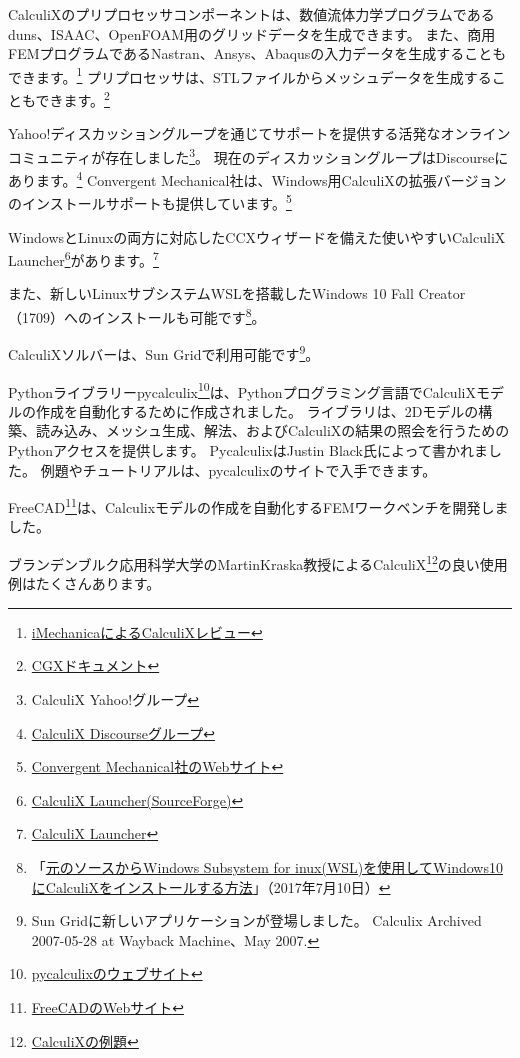 \documentclass[a4j,12pt,twoside,openany]{ltjsarticle}
\begin{document}
CalculiXのプリプロセッサコンポーネントは、数値流体力学プログラムであるduns、ISAAC、OpenFOAM用のグリッドデータを生成できます。
また、商用FEMプログラムであるNastran、Ansys、Abaqusの入力データを生成することもできます。\footnote{\href{http://imechanica.org/node/1628}{iMechanicaによるCalculiXレビュー}}
プリプロセッサは、STLファイルからメッシュデータを生成することもできます。\footnote{\href{http://bconverged.com/calculix/doc/cgx/html/cgx.html}{CGXドキュメント}}

Yahoo!ディスカッショングループを通じてサポートを提供する活発なオンラインコミュニティが存在しました\footnote{CalculiX Yahoo!グループ}。
現在のディスカッショングループはDiscourseにあります。\footnote{\href{https://calculix.discourse.group/}{CalculiX Discourseグループ}}
Convergent Mechanical社は、Windows用CalculiXの拡張バージョンのインストールサポートも提供しています。\footnote{\href{http://www.bconverged.com/}{Convergent Mechanical社のWebサイト}}

WindowsとLinuxの両方に対応したCCXウィザードを備えた使いやすいCalculiX Launcher\footnote{\href{https://sourceforge.net/projects/calculixforwin/}{CalculiX Launcher(SourceForge)}}があります。\footnote{\href{http://calculixforwin.blogspot.mx/2015/05/calculix-launcher.html}{CalculiX Launcher}}

また、新しいLinuxサブシステムWSLを搭載したWindows 10 Fall Creator（1709）へのインストールも可能です\footnote{「\href{https://carlomonjaraztec.wordpress.com/2017/07/10/ccx_in_win10/}{元のソースからWindows Subsystem for inux(WSL)を使用してWindows10にCalculiXをインストールする方法}」（2017年7月10日）}。

CalculiXソルバーは、Sun Gridで利用可能です\footnote{Sun Gridに新しいアプリケーションが登場しました。
Calculix Archived 2007-05-28 at Wayback Machine、May 2007.}。

Pythonライブラリーpycalculix\footnote{\href{http://justinablack.com/pycalculix/}{pycalculixのウェブサイト}}は、Pythonプログラミング言語でCalculiXモデルの作成を自動化するために作成されました。
ライブラリは、2Dモデルの構築、読み込み、メッシュ生成、解法、およびCalculiXの結果の照会を行うためのPythonアクセスを提供します。
PycalculixはJustin Black氏によって書かれました。
例題やチュートリアルは、pycalculixのサイトで入手できます。

FreeCAD\footnote{\href{https://freecadweb.org/}{FreeCADのWebサイト}}は、Calculixモデルの作成を自動化するFEMワークベンチを開発しました。

ブランデンブルク応用科学大学のMartinKraska教授によるCalculiX\footnote{\href{https://github.com/mkraska/CalculiX-Examples/}{CalculiXの例題}}の良い使用例はたくさんあります。
\end{document}
